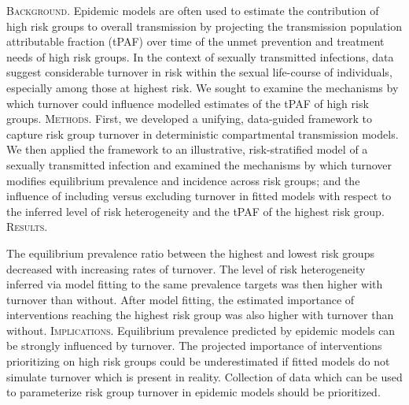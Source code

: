 \textsc{Background.}
Epidemic models are often used to estimate
the contribution of high risk groups to overall transmission 
by projecting the transmission population attributable fraction (tPAF) over time 
of the unmet prevention and treatment needs of high risk groups. 
In the context of sexually transmitted infections, data suggest considerable
turnover in risk within the sexual life-course of individuals, especially among those at 
highest risk. We sought to examine the mechanisms by which turnover could 
influence modelled estimates  of the tPAF of high risk groups.
\textsc{Methods.}
First, we developed a unifying, data-guided framework to capture risk group turnover 
in deterministic compartmental transmission models.
We then applied the framework to an illustrative, risk-stratified model of 
a sexually transmitted infection and examined the mechanisms by which 
turnover modifies equilibrium prevalence and incidence across risk groups; %
and the influence of including versus excluding turnover in fitted models with respect to
the inferred level of risk heterogeneity and %
the tPAF of the highest risk group.
\textsc{Results.}

The equilibrium prevalence ratio
between the highest and lowest risk groups
decreased with increasing rates of turnover. %
The level of risk heterogeneity inferred
via model fitting to the same prevalence targets
was then higher with turnover than without. %
After model fitting,
the estimated importance of interventions reaching the highest risk group
was also higher with turnover than without.
\textsc{Implications.}
Equilibrium prevalence predicted by epidemic models
can be strongly influenced by turnover.
The projected importance of interventions prioritizing on high risk groups
could be underestimated if fitted models do not simulate turnover
which is present in reality.
Collection of data which can be used to
parameterize risk group turnover in epidemic models should be prioritized. %
\\